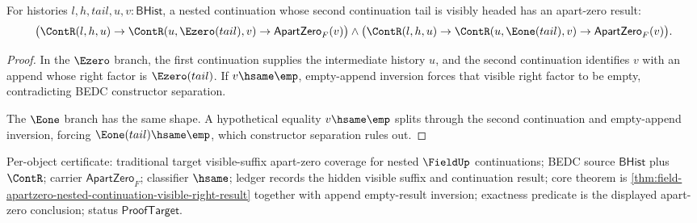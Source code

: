 \begin{theorem}
\label{thm:field-apartzero-nested-continuation-visible-right-result}
For histories $l,h,tail,u,v:\mathsf{BHist}$, a nested continuation whose
second continuation tail is visibly headed has an apart-zero result:
$$
\bigl(\ContR(l,h,u)\to\ContR(u,\Ezero(tail),v)\to
\mathsf{ApartZero}_F(v)\bigr)
\land
\bigl(\ContR(l,h,u)\to\ContR(u,\Eone(tail),v)\to
\mathsf{ApartZero}_F(v)\bigr).
$$
\end{theorem}
\begin{proof}
In the $\Ezero$ branch, the first continuation supplies the intermediate
history $u$, and the second continuation identifies $v$ with an append whose
right factor is $\Ezero(tail)$. If $v\hsame\emp$, empty-append inversion forces
that visible right factor to be empty, contradicting BEDC constructor
separation.

The $\Eone$ branch has the same shape. A hypothetical equality
$v\hsame\emp$ splits through the second continuation and empty-append
inversion, forcing $\Eone(tail)\hsame\emp$, which constructor separation
rules out.
\end{proof}

Per-object certificate: traditional target visible-suffix apart-zero coverage
for nested $\FieldUp$ continuations; BEDC source $\mathsf{BHist}$ plus
$\ContR$; carrier $\mathsf{ApartZero}_F$; classifier $\hsame$; ledger records
the hidden visible suffix and continuation result; core theorem is
\autoref{thm:field-apartzero-nested-continuation-visible-right-result}
together with append empty-result inversion; exactness predicate is the
displayed apart-zero conclusion; status $\mathsf{ProofTarget}$.

